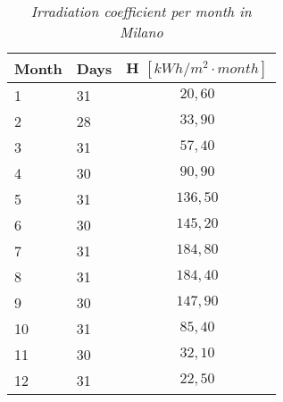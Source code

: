 \begin{table}[h!]
\centering
\begin{tabular}{|l|l|c|}
\hline
\rowcolor{bluepoli!40} \textbf{Month} & \textbf{Days} & \multicolumn{1}{l|}{\textbf{H }$[kWh/m^2\cdot month]$} \\ \hline
1              & 31            & $20,60$                          \\ \hline
2              & 28            & $33,90$                          \\ \hline
3              & 31            & $57,40$                          \\ \hline
4              & 30            & $90,90$                          \\ \hline
5              & 31            & $136,50$                         \\ \hline
6              & 30            & $145,20$                         \\ \hline
7              & 31            & $184,80$                         \\ \hline
8              & 31            & $184,40$                         \\ \hline
9              & 30            & $147,90$                         \\ \hline
10             & 31            & $85,40$                          \\ \hline
11             & 30            & $32,10$                          \\ \hline
12             & 31            & $22,50$                          \\ \hline
\end{tabular}
\caption{\textit{Irradiation coefficient per month in Milano\textsuperscript{\cite{PVINFOSYSTEM}}}}
\label{tab:hmilan}
\end{table}